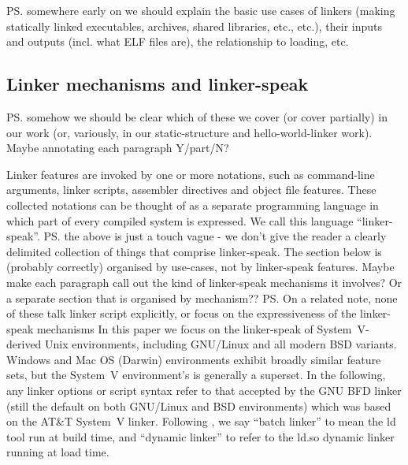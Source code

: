 \ps{somewhere early on we should explain the basic use cases of
  linkers (making statically linked executables, archives, shared
  libraries, etc., etc.), their inputs and outputs (incl. what ELF
  files are), the relationship
  to loading, etc.}

\subsection{Linker mechanisms and linker-speak}

\ps{somehow we should be clear which of these we cover (or cover
  partially) in our work (or, variously, in our static-structure and
  hello-world-linker work). Maybe annotating each paragraph Y/part/N?}

Linker features are invoked by one or more notations, 
such as command-line arguments, linker scripts, assembler directives and 
object file features.
These collected notations can be thought of as a separate programming language
in which part of every compiled system is expressed.
We call this language ``linker-speak''.
\ps{the above is just a touch vague - we don't give the reader a
  clearly delimited collection of things that comprise
  linker-speak. The section below is (probably correctly) organised by
  use-cases, not by linker-speak features.  Maybe make each paragraph
  call out the kind of linker-speak mechanisms it involves?  Or a
  separate section that is organised by mechanism??}
\ps{On a related note, none of these talk linker script explicitly, or
  focus on the expressiveness of the linker-speak mechanisms}
In this paper we focus on the linker-speak of System~V-derived Unix environments,
including GNU/Linux and all modern BSD variants.
Windows and Mac OS (Darwin) environments exhibit broadly similar feature sets,
but the System~V environment's is generally a superset.
In the following, any linker options or script syntax
refer to that accepted by the GNU BFD linker (still the 
default on both GNU/Linux and BSD environments)
which was based on the AT\&T System~V linker.
Following \citet{gingell_1987_shared}, we say ``batch linker''
to mean the \textsf{ld} tool run at build time, and 
``dynamic linker'' to refer to the \textsf{ld.so} dynamic linker running
at load time.



